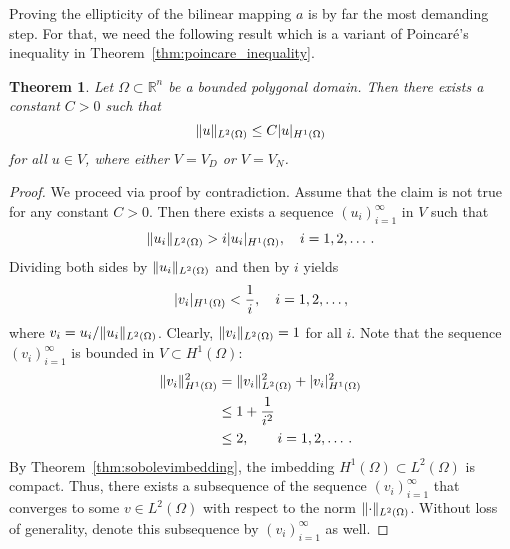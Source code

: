 \documentclass[english, 12pt, a4paper, sci, utf8, a-2b, online]{aaltothesis}
\theoremstyle{definition}
\theoremstyle{plain}
\newtheorem{theorem}{Theorem}[section]
\DeclarePairedDelimiter\abs{\lvert}{\rvert}
\DeclarePairedDelimiter\norm{\lVert}{\rVert}
\numberwithin{equation}{section}
\begin{document}
Proving the ellipticity of the bilinear mapping $a$ is by far the most demanding step.
For that, we need the following result which is a variant of Poincaré's inequality in
Theorem~\ref{thm:poincare_inequality}.
\begin{theorem}
    \label{thm:friedrichs_inequality}
    Let $\Omega \subset \mathbb{R}^n$ be a bounded polygonal domain.
    Then there exists a constant $C > 0$ such that
    \begin{equation*}
        \norm{u}_{L^2(\Omega)} \leq C \abs{u}_{H^1(\Omega)}
    \end{equation*}
    for all $u \in V$, where either $V = V_D$ or $V = V_N$.
\end{theorem}
\begin{proof}
    We proceed via proof by contradiction.
    Assume that the claim is not true for any constant $C > 0$.
    Then there exists a sequence $(u_i)_{i=1}^{\infty}$ in $V$ such that
    \begin{equation*}
        \norm{u_i}_{L^2(\Omega)} > i \abs{u_i}_{H^1(\Omega)},
        \quad i=1,2,\dotsc.
    \end{equation*}
    Dividing both sides by $\norm{u_i}_{L^2(\Omega)}$
    and then by $i$ yields
    \begin{equation*}
        \abs{v_i}_{H^1(\Omega)} < \frac{1}{i},
        \quad i=1,2,\dotsc,
    \end{equation*}
    where $v_i = u_i / \norm{u_i}_{L^2(\Omega)}$.
    Clearly, $\norm{v_i}_{L^2(\Omega)} = 1$ for all $i$.
    Note that the sequence $(v_i)_{i=1}^{\infty}$ is bounded in
    $V \subset H^1(\Omega)$:
    \begin{align*}
        \norm{v_i}_{H^1(\Omega)}^2
        &= \norm{v_i}_{L^2(\Omega)}^2 + \abs{v_i}_{H^1(\Omega)}^2 \\
        &\leq 1 + \frac{1}{i^2} \\
        &\leq 2,
        \qquad i=1,2,\dotsc.
    \end{align*}
    By Theorem~\ref{thm:sobolevimbedding}, the imbedding
    $H^1(\Omega) \subset L^2(\Omega)$ is compact. Thus, there exists
    a subsequence of the sequence $(v_i)_{i=1}^{\infty}$ that converges
    to some $v \in L^2(\Omega)$ with respect to the norm
    $\norm{\cdot}_{L^2(\Omega)}$. Without loss of generality,
    denote this subsequence by $(v_i)_{i=1}^{\infty}$ as well.


\end{proof}
\end{document}
